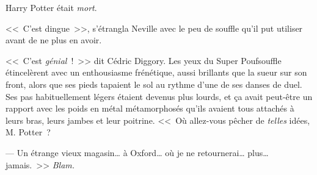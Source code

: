 Harry Potter était \emph{mort}.

\later

<<~C'est dingue~>>, s'étrangla Neville avec le peu de souffle qu'il put utiliser avant de ne plus en avoir.

<<~C'est \emph{génial}~!~>> dit Cédric Diggory. Les yeux du Super Poufsouffle étincelèrent avec un enthousiasme frénétique, aussi brillants que la sueur sur son front, alors que ses pieds tapaient le sol au rythme d'une de ses danses de duel. Ses pas habituellement légers étaient devenus plus lourds, et ça avait peut-être un rapport avec les poids en métal métamorphosés qu'ils avaient tous attachés à leurs bras, leurs jambes et leur poitrine. <<~Où allez-vous pêcher de \emph{telles} idées, M. Potter~?

--- Un étrange vieux magasin… à Oxford… où je ne retournerai… plus… jamais.~>> \emph{Blam.} 

